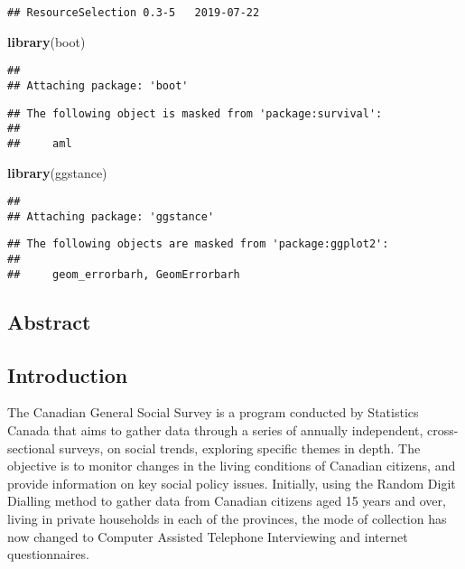 \documentclass[
]{article}
\newenvironment{Shaded}{\begin{snugshade}}{\end{snugshade}}
\newcommand{\KeywordTok}[1]{\textcolor[rgb]{0.13,0.29,0.53}{\textbf{#1}}}
\newcommand{\NormalTok}[1]{#1}
\begin{document}
\begin{verbatim}
## ResourceSelection 0.3-5   2019-07-22
\end{verbatim}

\begin{Shaded}
\begin{Highlighting}[]
\KeywordTok{library}\NormalTok{(boot)}
\end{Highlighting}
\end{Shaded}

\begin{verbatim}
## 
## Attaching package: 'boot'
\end{verbatim}

\begin{verbatim}
## The following object is masked from 'package:survival':
## 
##     aml
\end{verbatim}

\begin{Shaded}
\begin{Highlighting}[]
\KeywordTok{library}\NormalTok{(ggstance)}
\end{Highlighting}
\end{Shaded}

\begin{verbatim}
## 
## Attaching package: 'ggstance'
\end{verbatim}

\begin{verbatim}
## The following objects are masked from 'package:ggplot2':
## 
##     geom_errorbarh, GeomErrorbarh
\end{verbatim}

\hypertarget{abstract}{%
\subsection{Abstract}\label{abstract}}

\hypertarget{introduction}{%
\subsection{Introduction}\label{introduction}}

The Canadian General Social Survey is a program conducted by Statistics
Canada that aims to gather data through a series of annually
independent, cross-sectional surveys, on social trends, exploring
specific themes in depth. The objective is to monitor changes in the
living conditions of Canadian citizens, and provide information on key
social policy issues. Initially, using the Random Digit Dialling method
to gather data from Canadian citizens aged 15 years and over, living in
private households in each of the provinces, the mode of collection has
now changed to Computer Assisted Telephone Interviewing and internet
questionnaires.
\end{document}
